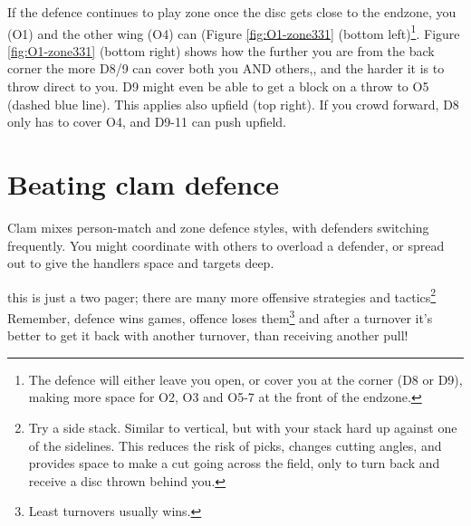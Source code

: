 \documentclass{tufte-handout}
\begin{document}
If the defence 
continues to play zone 
once the disc 
gets close to the endzone, 
you (O1) 
and the other wing (O4) 
can 
(Figure \ref{fig:O1-zone331} (bottom left)\footnote{ 
The defence 
will either  
leave you open,
or cover you
at the corner
(D8 
or D9), 
making more space 
for O2, 
O3 and
O5-7 
at the front of the endzone.}.
Figure \ref{fig:O1-zone331} (bottom right) shows 
how the further 
you are from the back corner 
the more D8/9 
can cover both you
AND others,, 
and the harder 
it is to throw direct to you.
D9 might even be able to get a block
on a throw to O5
(dashed blue line). 
This applies also 
upfield
(top right).
If you crowd forward,
D8 only has to cover O4, 
and D9-11 
can push upfield.


\section{Beating clam defence}\label{sec:zone}
Clam mixes person-match 
and zone defence styles, 
with defenders 
switching frequently.
You might
coordinate 
with others  
to overload 
a defender, 
or spread out 
to give the handlers 
space 
and targets deep. 

this is just a two pager; 
there are many more 
offensive strategies 
and tactics\footnote{
Try 
a side stack. 
Similar to vertical, 
but with your stack 
hard up against 
one of the sidelines. 
This reduces the risk of picks, 
changes cutting angles, 
and provides space 
to make a cut going across 
the field, only to turn back 
and receive 
a disc thrown 
behind you.}
Remember, 
defence wins games, 
offence loses them\footnote{
Least turnovers 
usually wins.} 
and after a turnover 
it's better to get it back 
with another turnover, 
than receiving another pull!
\end{document}
